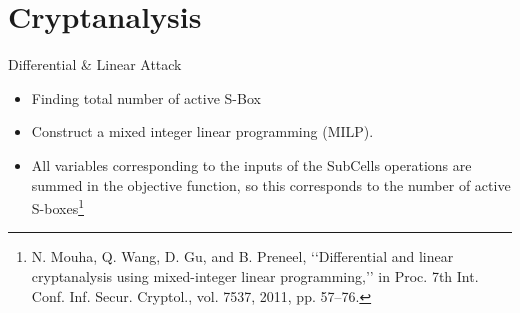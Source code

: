 \section{Cryptanalysis}
\begin{frame}{Differential \& Linear Attack}
    \begin{itemize}
         \item  Finding total number of active S-Box 
         \pause
         \item Construct a mixed integer linear programming (MILP).
         \pause
         \item All variables corresponding to the inputs of the
                SubCells operations are summed in the objective function,
                    so this corresponds to the number of active S-boxes\footnote{N. Mouha, Q. Wang, D. Gu, and B. Preneel, ‘‘Differential and linear
cryptanalysis using mixed-integer linear programming,’’ in Proc. 7th Int.
Conf. Inf. Secur. Cryptol., vol. 7537, 2011, pp. 57–76.}
    \end{itemize}
\end{frame}

